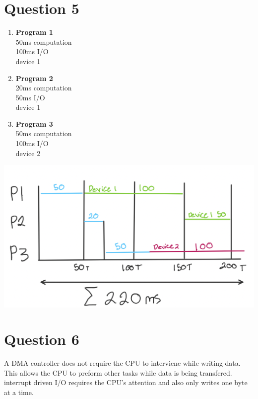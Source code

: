 \documentclass[11pt]{article}
\begin{document}
\section*{Question 5}
\begin{enumerate}
    \item \textbf{Program 1}\\
    50ms computation\\
    100ms I/O\\
    device 1
    \item \textbf{Program 2}\\
    20ms computation\\
    50ms I/O\\
    device 1
    \item \textbf{Program 3}\\
    50ms computation\\
    100ms I/O\\
    device 2
\end{enumerate}
\includegraphics[scale=0.3]{diagram}

\section*{Question 6}
A DMA controller does not require the CPU to 
interviene while writing data. This allows the 
CPU to preform other tasks while data is being
transfered. interrupt driven I/O requires the 
CPU's attention and also only writes one byte at
a time.
\end{document}
